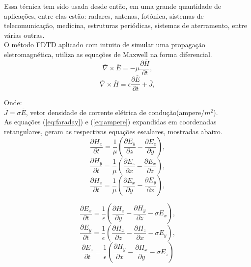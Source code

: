 Essa técnica tem sido usada desde então, em uma grande quantidade de aplicações, entre elas estão: radares, antenas, fotônica, sistemas de telecomunicação, medicina, estruturas periódicas, sistemas de aterramento, entre várias outras.\\

O método FDTD aplicado com intuito de simular uma propagação eletromagnética, utiliza as equações de Maxwell na forma diferencial.
\begin{equation}\label{eq:faraday}
	\overline{\nabla}\times\overline{E}=-\mu\frac{\partial \overline{H}}{\partial t},
\end{equation}
\begin{equation}\label{eq:ampere}
		\overline{\nabla}\times\overline{H}=\epsilon\frac{\partial \overline{E}}{\partial t} + \overline{J},
\end{equation}
		
	Onde:\\
	$\overline{J} = \sigma\overline{E}$, vetor densidade de corrente elétrica  de condução(ampere/$m^{2}$).\\ 

As equações (\ref{eq:faraday}) e (\ref{eq:ampere}) expandidas em coordenadas retangulares, geram as respectivas equações escalares, mostradas abaixo.
\begin{equation}
	\frac{\partial H_x}{\partial t} = \frac{1}{\mu}(\frac{\partial E_y}{\partial z}-\frac{\partial E_z}{\partial y}),
\end{equation}
\begin{equation}
	\frac{\partial H_y}{\partial t} = \frac{1}{\mu}(\frac{\partial E_z}{\partial x}-\frac{\partial E_x}{\partial z}),
\end{equation}
\begin{equation}
	\frac{\partial H_z}{\partial t} = \frac{1}{\mu}(\frac{\partial E_x}{\partial y}-\frac{\partial E_y}{\partial x}),
\end{equation}

\begin{equation}
	\frac{\partial E_x}{\partial t} = \frac{1}{\epsilon}(\frac{\partial H_z}{\partial y}-\frac{\partial H_y}{\partial z} -\sigma E_x),
\end{equation}
\begin{equation}
	\frac{\partial E_y}{\partial t} = \frac{1}{\epsilon}(\frac{\partial H_x}{\partial z}-\frac{\partial H_z}{\partial x} -\sigma E_y),
\end{equation}
\begin{equation}
	\frac{\partial E_z}{\partial t} = \frac{1}{\epsilon}(\frac{\partial H_y}{\partial x}-\frac{\partial H_x}{\partial y} -\sigma E_z)
\end{equation}

